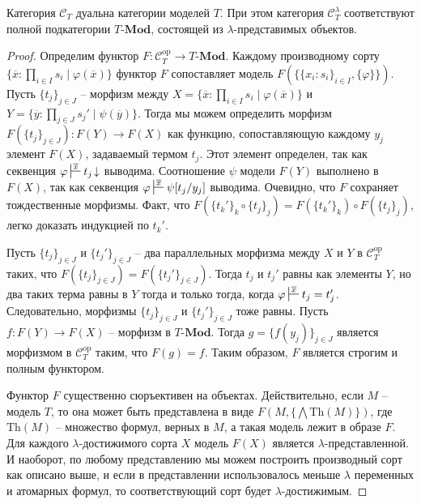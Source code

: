 \documentclass[reqno]{amsart}
\theoremstyle{definition}
\theoremstyle{remark}
\newcommand{\bcat}[1]{\mathbf{#1}}
\newcommand{\cat}[1]{\mathcal{#1}}
\newcommand{\Mod}[1]{#1\text{-}\bcat{Mod}}
\newcommand{\fs}[1]{\mathrm{#1}}
\begin{document}
\begin{prop}
Категория $\cat{C}_T$ дуальна категории моделей $T$.
При этом категория $\cat{C}_T^\lambda$ соответствуют полной подкатегории $\Mod{T}$, состоящей из $\lambda$-представимых объектов.
\end{prop}
\begin{proof}
Определим функтор $F : \cat{C}_T^\fs{op} \to \Mod{T}$.
Каждому производному сорту $\{ \overline{x} : \prod_{i \in I} s_i \mid \varphi(\overline{x}) \}$ функтор $F$ сопоставляет модель $F(\{ \{ x_i : s_i \}_{i \in I}, \{ \varphi \} \})$.
Пусть $\{ t_j \}_{j \in J}$ -- морфизм между $X = \{ \overline{x} : \prod_{i \in I} s_i \mid \varphi(\overline{x}) \}$ и $Y = \{ \overline{y} : \prod_{j \in J} s_j' \mid \psi(\overline{y}) \}$.
Тогда мы можем определить морфизм $F(\{ t_j \}_{j \in J}) : F(Y) \to F(X)$ как функцию, сопоставляющую каждому $y_j$ элемент $F(X)$, задаваемый термом $t_j$.
Этот элемент определен, так как секвенция $\varphi \sststile{}{\overline{x}} t_j\!\downarrow$ выводима.
Соотношение $\psi$ модели $F(Y)$ выполнено в $F(X)$, так как секвенция $\varphi \sststile{}{\overline{x}} \psi[t_j/y_j]$ выводима.
Очевидно, что $F$ сохраняет тождественные морфизмы.
Факт, что $F(\{ t_k' \}_k \circ \{ t_j \}_j) = F(\{ t_k' \}_k) \circ F(\{ t_j \}_j)$, легко доказать индукцией по $t_k'$.

Пусть $\{ t_j \}_{j \in J}$ и $\{ t_j' \}_{j \in J}$ -- два параллельных морфизма между $X$ и $Y$ в $\cat{C}_T^\fs{op}$ таких, что $F(\{ t_j \}_{j \in J}) = F(\{ t_j' \}_{j \in J})$.
Тогда $t_j$ и $t_j'$ равны как элементы $Y$, но два таких терма равны в $Y$ тогда и только тогда, когда $\varphi \sststile{}{\overline{x}} t_j = t_j'$.
Следовательно, морфизмы $\{ t_j \}_{j \in J}$ и $\{ t_j' \}_{j \in J}$ тоже равны.
Пусть $f : F(Y) \to F(X)$ -- морфизм в $\Mod{T}$.
Тогда $g = \{ f(y_j) \}_{j \in J}$ является морфизмом в $\cat{C}_T^\fs{op}$ таким, что $F(g) = f$.
Таким образом, $F$ является строгим и полным функтором.

Функтор $F$ существенно сюръективен на объектах.
Действительно, если $M$ -- модель $T$, то она может быть представлена в виде $F(M, \{ \bigwedge \fs{Th}(M) \})$, где $\fs{Th}(M)$ -- множество формул, верных в $M$, а такая модель лежит в образе $F$.
Для каждого $\lambda$-достижимого сорта $X$ модель $F(X)$ является $\lambda$-представленной.
И наоборот, по любому представлению мы можем построить производный сорт как описано выше, и если в представлении использовалось меньше $\lambda$ переменных и атомарных формул, то соответствующий сорт будет $\lambda$-достижимым.
\end{proof}
\end{document}
